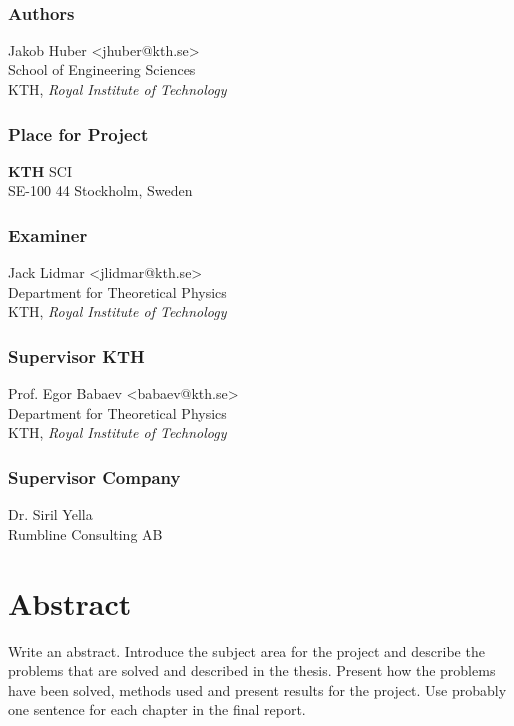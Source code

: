 \newpage
\thispagestyle{plain}
~\\
\vfill
{ 
	\subsection*{Authors}
	Jakob Huber <jhuber@kth.se>\\
	School of Engineering Sciences\\
	KTH, \textit{Royal Institute of Technology}
	
	\subsection*{Place for Project}
	\textbf{KTH} SCI\\
	SE-100 44 Stockholm, Sweden

	\subsection*{Examiner}
	Jack Lidmar <jlidmar@kth.se>\\
	Department for Theoretical Physics \\
	KTH, \textit{Royal Institute of Technology}
	
	\subsection*{Supervisor KTH}
	Prof. Egor Babaev <babaev@kth.se>\\
	Department for Theoretical Physics\\
	KTH, \textit{Royal Institute of Technology}

	\subsection*{Supervisor Company}
	Dr. Siril Yella \\
	Rumbline Consulting AB
}


\newpage
\thispagestyle{plain}
\chapter*{Abstract}

Write an abstract. Introduce the subject area for the project and describe the problems that are solved and described in the thesis. Present how the problems have been solved, methods used and present results for the project. Use probably one sentence for each chapter in the final report.

